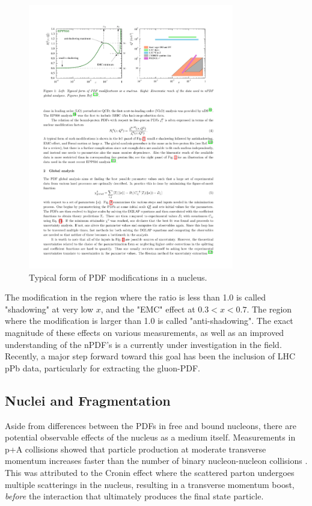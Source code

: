 \begin{figure}[htpb]
  \centering
  \includegraphics[width=0.8\textwidth]{Introduction/cnm_cartoon}
  \caption{Typical form of PDF modifications in a nucleus\cite{Pumplin2001}.}
  \label{fig:cnm_cartoon}
\end{figure}

The modification in the region where the ratio is less than 1.0 is called "shadowing" at very low $x$, and the "EMC" effect at  $0.3 < x < 0.7$. The region where the modification is larger than 1.0 is called "anti-shadowing". The exact magnitude of these effects on various measurements, as well as an improved understanding of the nPDF's is a currently under investigation in the field. Recently, a major step forward toward this goal has been the inclusion of LHC pPb data, particularly for extracting the gluon-PDF.
\subsection{Nuclei and Fragmentation}

Aside from differences between the PDFs in free and bound nucleons, there are potential observable effects of the nucleus as a medium itself. Measurements in p+A collisions showed that particle production at moderate transverse momentum increases faster than the number of binary nucleon-nucleon collisions \cite{Cronin1975}. This was attributed to the Cronin effect where the scattered parton undergoes multiple scatterings in the nucleus, resulting in a transverse momentum boost, \textit{before} the interaction that ultimately produces the final state particle. 

